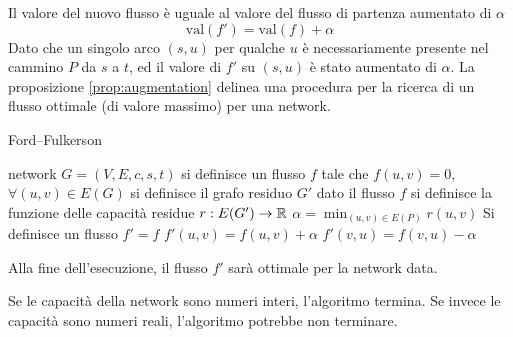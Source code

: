 \documentclass[10pt, letterpaper]{report}
\begin{document}
Il valore del nuovo flusso è uguale al valore del flusso di partenza aumentato di $\alpha$ 
$$ \text{val}(f')=\text{val}(f)+\alpha$$
Dato che un singolo arco $(s,u)$ per qualche $u$ è necessariamente presente nel cammino $P$ da $s$ a $t$, ed il valore di $f'$ su $(s,u)$ è stato aumentato di $\alpha$.
La proposizione \ref{prop:augmentation} delinea una procedura per la ricerca di un flusso ottimale (di valore massimo) per una network.
\begin{algorithm}
    \caption{Ford–Fulkerson}\label{alg:Ford–Fulkerson}
    \begin{algorithmic}
    \Require network $G=(V,E,c,s,t)$
    \State si definisce un flusso $f$ tale che $f(u,v)=0$, $\forall (u,v)\in E(G)$
    \State si definisce il grafo residuo $G'$ dato il flusso $f$
    \State si definisce la funzione delle capacità residue $r:E(G')\rightarrow {\mathbb R}$
    \State $\displaystyle\alpha=\min_{(u,v)\in E(P)}r(u,v)$
    \State Si definisce un flusso $f'=f$
    \State $f'(u,v)=f(u,v)+\alpha$
    \State $f'(v,u)=f(v,u)-\alpha$
    \EndFor
    \EndWhile
    \end{algorithmic}
    \end{algorithm}
Alla fine dell'esecuzione, il flusso $f'$ sarà ottimale per la network data.
\begin{osservazione}
Se le capacità della network sono numeri interi, l'algoritmo termina. Se invece le capacità sono numeri reali, l'algoritmo potrebbe non terminare.
\end{osservazione}
\end{document}
